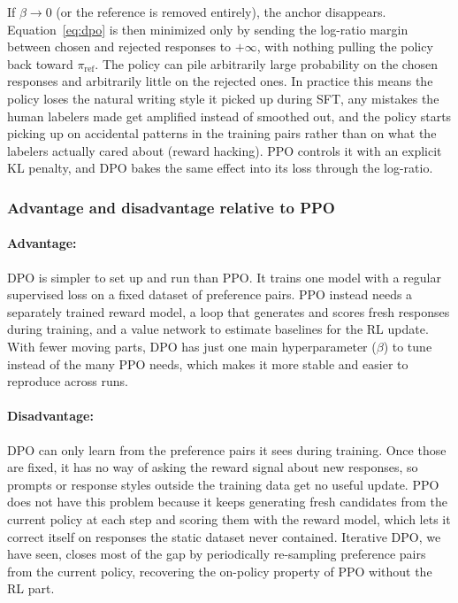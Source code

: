 \documentclass{article}
\begin{document}
If $\beta \to 0$ (or the reference is removed entirely), the anchor
disappears. Equation~\ref{eq:dpo} is then minimized only by sending the
log-ratio margin between chosen and rejected responses to $+\infty$, with
nothing pulling the policy back toward $\pi_\text{ref}$. The policy can
pile arbitrarily large probability on the chosen responses and
arbitrarily little on the rejected ones. In practice this means the policy loses the
natural writing style it picked up during SFT, any mistakes the human
labelers made get amplified instead of smoothed out, and the policy
starts picking up on accidental patterns in the training pairs rather
than on what the labelers actually cared about (reward hacking). PPO controls it with an explicit KL penalty, and
DPO bakes the same effect into its loss through the log-ratio.

\subsubsection*{Advantage and disadvantage relative to PPO}

\paragraph{Advantage:} DPO is simpler to set up and run than PPO. It
trains one model with a regular supervised loss on a fixed dataset of
preference pairs. PPO instead needs a separately trained reward model, a
loop that generates and scores fresh responses during training, and a
value network to estimate baselines for the RL update. With fewer moving
parts, DPO has just one main hyperparameter ($\beta$) to tune instead of
the many PPO needs, which makes it more stable and easier to
reproduce across runs.

\paragraph{Disadvantage:} DPO can only learn from the preference pairs it
sees during training. Once those are fixed, it has no way of asking the
reward signal about new responses, so prompts or response styles outside
the training data get no useful update. PPO does not have this problem
because it keeps generating fresh candidates from the current policy at
each step and scoring them with the reward model, which lets it correct
itself on responses the static dataset never contained. Iterative DPO, we have seen, closes most of the gap by periodically re-sampling
preference pairs from the current policy, recovering the on-policy
property of PPO without the RL part.
\end{document}
